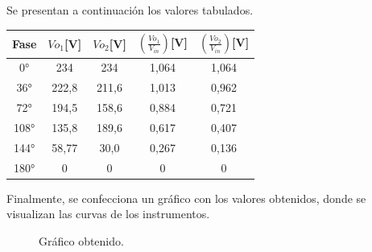 Se presentan a continuación los valores tabulados.

\begin{table}[H]
\centering
  \begin{tabular}{|c|c|c|c|c|}
    \hline
      Fase & $Vo_1$[V] & $Vo_2$[V] & $(\frac{Vo_1}{V_{in}})$[V] & $(\frac{Vo_2}{V_{in}})$[V] \\
    \hline
      0°    & 234     & 234     & 1,064   & 1,064\\
      36°   & 222,8   & 211,6   & 1,013   & 0,962\\
      72°   & 194,5   & 158,6   & 0,884   & 0,721\\
      108°  & 135,8   & 189,6   & 0,617   & 0,407\\
      144°  & 58,77   & 30,0    & 0,267   & 0,136\\
      180°  & 0       & 0       & 0       & 0\\
    \hline
  \end{tabular}
\end{table}

Finalmente, se confecciona un gráfico con los valores obtenidos, 
donde se visualizan las curvas de los instrumentos.

\begin{figure}[H]
  \centering
  \caption{Gráfico obtenido.}
  \label{fig:CurvaTrueMedio}
\end{figure}



